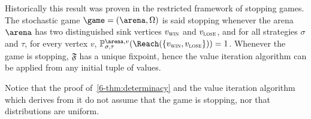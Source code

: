 Historically this result was proven in the restricted framework of
stopping games. The stochastic game $\game = (\arena,\Omega)$ is said
stopping whenever the arena $\arena$ has two distinguished sink
vertices $v_{\textsc{win}}$ and $v_{\textsc{lose}}$, and for all strategies $\sigma$ and
$\tau$, for every vertex $v$,
$\probm_{\sigma,\tau}^{\arena,v}(\Reach(\{\vwin,\vlose\})) =
1$. Whenever the game is stopping, $\mathfrak{F}$ has a unique
fixpoint, hence the value iteration algorithm can be applied from any
initial tuple of values.

Notice that the proof of~\cref{6-thm:determinacy} and the value
iteration algorithm which derives from it do not assume that the game
is stopping, nor that distributions are uniform.
